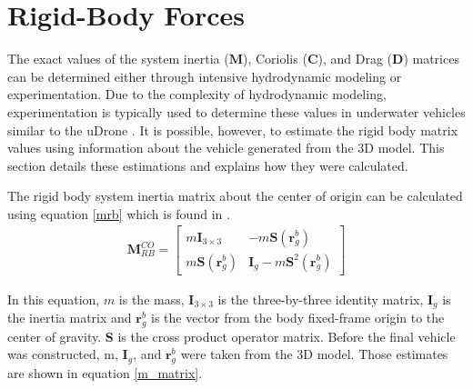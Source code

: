 \section{Rigid-Body Forces}

The exact values of the system inertia ($\boldsymbol{M}$), Coriolis ($\boldsymbol{C}$), and Drag ($\boldsymbol{D}$) matrices can be determined either through intensive hydrodynamic modeling or experimentation. Due to the complexity of hydrodynamic modeling, experimentation is typically used to determine these values in underwater vehicles similar to the uDrone \parencite{hipp_pen}. It is possible, however, to estimate the rigid body matrix values using information about the vehicle generated from the 3D model. This section details these estimations and explains how they were calculated. 

The rigid body system inertia matrix about the center of origin can be calculated using equation \ref{mrb} which is found in \cite{thor_rb}.
\begin{gather}
    \boldsymbol{M}_{R B}^{C O}=\left[\begin{array}{cc}
        m \boldsymbol{I}_{3 \times 3} & -m \boldsymbol{S}\left(\boldsymbol{r}_{g}^{b}\right) \\
        m \boldsymbol{S}\left(\boldsymbol{r}_{g}^{b}\right) & \boldsymbol{I}_{g}-m \boldsymbol{S}^{2}\left(\boldsymbol{r}_{g}^{b}\right)
    \end{array}\right]
    \label{mrb}
\end{gather}

In this equation, $m$ is the mass, $\boldsymbol{I}_{3 \times 3}$ is the three-by-three identity matrix, $\boldsymbol{I}_{g}$ is the inertia matrix and $\boldsymbol{r}_{g}^{b}$ is the vector from the body fixed-frame origin to the center of gravity. $\boldsymbol{S}$ is the cross product operator matrix. Before the final vehicle was constructed, m, $\boldsymbol{I}_{g}$, and $\boldsymbol{r}_{g}^{b}$ were taken from the 3D model. Those estimates are shown in equation \ref{m_matrix}.

